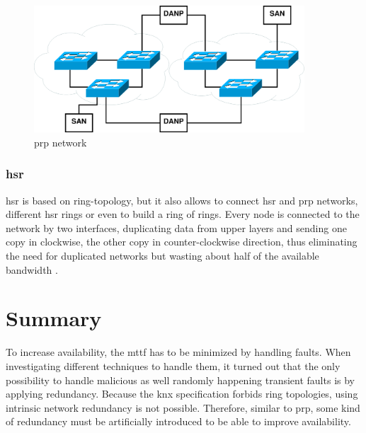 \begin{figure}
    \centering
    \includegraphics[width=0.9\textwidth]{figures/prp.eps}
    \caption{\gls{prp} network}
    \label{fig:prp}
\end{figure}

\subsubsection{\gls{hsr}}
\gls{hsr} is based on ring-topology, but it also allows to connect \gls{hsr} and \gls{prp} networks, different \gls{hsr} rings or even to build a ring of rings. 
Every node is connected to the network by two interfaces, duplicating data from upper layers and sending one copy in clockwise, the other copy in counter-clockwise direction,
thus eliminating the need for duplicated networks but wasting about half of the available bandwidth \cite{6174793}. 

\section{Summary}
To increase availability, the \gls{mttf} has to be minimized by handling faults.
When investigating different techniques to handle them, it turned out that the only possibility to handle malicious as well randomly happening transient faults is by applying
redundancy. Because the \gls{knx} specification forbids ring topologies, using intrinsic network redundancy is not possible. Therefore, similar to \gls{prp},
some kind of redundancy must be artificially introduced to be able to improve availability.


